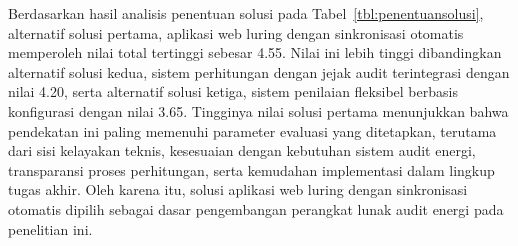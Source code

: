

Berdasarkan hasil analisis penentuan solusi pada Tabel~\ref{tbl:penentuansolusi}, alternatif solusi pertama, aplikasi web luring dengan sinkronisasi otomatis memperoleh nilai total tertinggi sebesar 4.55. Nilai ini lebih tinggi dibandingkan alternatif solusi kedua, sistem perhitungan dengan jejak audit terintegrasi dengan nilai 4.20, serta alternatif solusi ketiga, sistem penilaian fleksibel berbasis konfigurasi dengan nilai 3.65. Tingginya nilai solusi pertama menunjukkan bahwa pendekatan ini paling memenuhi parameter evaluasi yang ditetapkan, terutama dari sisi kelayakan teknis, kesesuaian dengan kebutuhan sistem audit energi, transparansi proses perhitungan, serta kemudahan implementasi dalam lingkup tugas akhir. Oleh karena itu, solusi aplikasi web luring dengan sinkronisasi otomatis dipilih sebagai dasar pengembangan perangkat lunak audit energi pada penelitian ini.